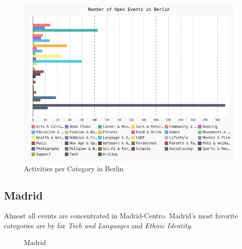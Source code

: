 \begin{figure}[!htp]
	\centering
	\includegraphics[width=1\linewidth]{../plotting/pngs/categories/Berlin.png}
	\caption{Activities per Category in Berlin}\label{fig:berlinbar}	
\end{figure}


\subsection*{Madrid}

Almost all events are concentrated in Madrid-Centro. Madrid's most favorite categories are by far \emph{Tech and Languages} and \emph{Ethnic Identity}. 

\begin{figure}[!htp]
	\hfill
	\caption{Madrid}
\end{figure}

